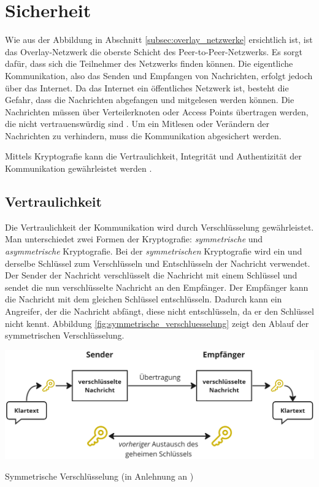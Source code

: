 \section{Sicherheit}
\label{sec:sicherheit_basics}

Wie aus der Abbildung in Abschnitt \ref{subsec:overlay_netzwerke} \textit{} ersichtlich ist, ist das Overlay-Netzwerk die oberste Schicht des Peer-to-Peer-Netzwerks. Es sorgt dafür, dass sich die Teilnehmer des Netzwerks finden können. Die eigentliche Kommunikation, also das Senden und Empfangen von Nachrichten, erfolgt jedoch über das Internet. Da das Internet ein öffentliches Netzwerk ist, besteht die Gefahr, dass die Nachrichten abgefangen und mitgelesen werden können. Die Nachrichten müssen über Verteilerknoten oder Access Points übertragen werden, die nicht vertrauenswürdig sind \parencite[S. 235]{Wong_KryptoPraxis}. Um ein Mitlesen oder Verändern der Nachrichten zu verhindern, muss die Kommunikation abgesichert werden. 

Mittels Kryptografie kann die Vertraulichkeit, Integrität und Authentizität der Kommunikation gewährleistet werden \Parencite[S. 7]{Hellmann_IT-Sicherheit}.


\subsection{Vertraulichkeit}
\label{subsec:vertraulichkeit_basics}

Die Vertraulichkeit der Kommunikation wird durch Verschlüsselung gewährleistet. Man unterschiedet zwei Formen der Kryptografie: \textit{symmetrische} und \textit{asymmetrische} Kryptografie. Bei der \textit{symmetrischen} Kryptografie wird ein und derselbe Schlüssel zum Verschlüsseln und Entschlüsseln der Nachricht verwendet. Der Sender der Nachricht verschlüsselt die Nachricht mit einem Schlüssel und sendet die nun verschlüsselte Nachricht an den Empfänger. Der Empfänger kann die Nachricht mit dem gleichen Schlüssel entschlüsseln. Dadurch kann ein Angreifer, der die Nachricht abfängt, diese nicht entschlüsseln, da er den Schlüssel nicht kennt. Abbildung \ref{fig:symmetrische_verschluesselung} zeigt den Ablauf der symmetrischen Verschlüsselung.

\begin{center}
    \captionsetup{type=figure}
    \includegraphics[width=1\linewidth]{images/symmetric_encryption.png}
    \caption{Symmetrische Verschlüsselung (in Anlehnung an \cite{ElektronikKompendium_symmetrischeVerschluesselung})}
    \label{fig:symmetrische_verschluesselung}
\end{center}

